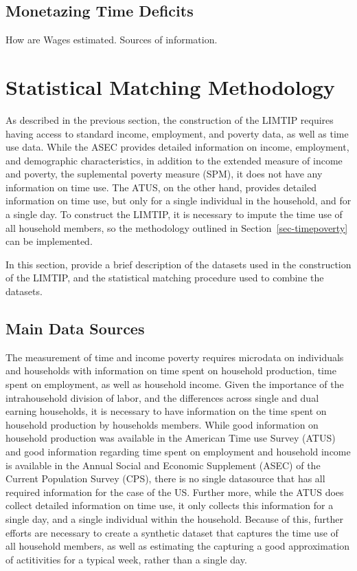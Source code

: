 \documentclass[
  11pt,
]{article}
\begin{document}
\subsection{Monetazing Time Deficits}\label{monetazing-time-deficits}

How are Wages estimated. Sources of information.

\section{Statistical Matching Methodology}\label{sec-smatch}

As described in the previous section, the construction of the LIMTIP
requires having access to standard income, employment, and poverty data,
as well as time use data. While the ASEC provides detailed information
on income, employment, and demographic characteristics, in addition to
the extended measure of income and poverty, the suplemental poverty
measure (SPM), it does not have any information on time use. The ATUS,
on the other hand, provides detailed information on time use, but only
for a single individual in the household, and for a single day. To
construct the LIMTIP, it is necessary to impute the time use of all
household members, so the methodology outlined in
Section~\ref{sec-timepoverty} can be implemented.

In this section, provide a brief description of the datasets used in the
construction of the LIMTIP, and the statistical matching procedure used
to combine the datasets.

\subsection{Main Data Sources}\label{main-data-sources}

The measurement of time and income poverty requires microdata on
individuals and households with information on time spent on household
production, time spent on employment, as well as household income. Given
the importance of the intrahousehold division of labor, and the
differences across single and dual earning households, it is necessary
to have information on the time spent on household production by
households members. While good information on household production was
available in the American Time use Survey (ATUS) and good information
regarding time spent on employment and household income is available in
the Annual Social and Economic Supplement (ASEC) of the Current
Population Survey (CPS), there is no single datasource that has all
required information for the case of the US. Further more, while the
ATUS does collect detailed information on time use, it only collects
this information for a single day, and a single individual within the
household. Because of this, further efforts are necessary to create a
synthetic dataset that captures the time use of all household members,
as well as estimating the capturing a good approximation of actitivities
for a typical week, rather than a single day.
\end{document}
